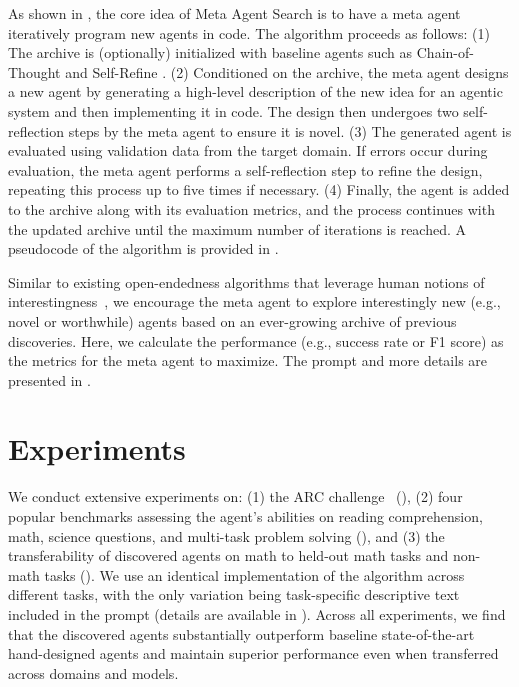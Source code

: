 \documentclass{article}
\newcommand{\ouralgo}{Meta Agent Search\xspace}
\begin{document}
As shown in , the core idea of \ouralgo is to have a meta agent iteratively program new agents in code. The algorithm proceeds as follows: (1) The archive is (optionally) initialized with baseline agents such as Chain-of-Thought \citep{wei2022chain} and Self-Refine \citep{madaan2024self,shinn2024reflexion}. (2) Conditioned on the archive, the meta agent designs a new agent by generating a high-level description of the new idea for an agentic system and then implementing it in code. The design then undergoes two self-reflection \citep{madaan2024self,shinn2024reflexion} steps by the meta agent to ensure it is novel. (3) The generated agent is evaluated using validation data from the target domain. If errors occur during evaluation, the meta agent performs a self-reflection step to refine the design, repeating this process up to five times if necessary. (4) Finally, the agent is added to the archive along with its evaluation metrics, and the process continues with the updated archive until the maximum number of iterations is reached. A pseudocode of the algorithm is provided in .

Similar to existing open-endedness algorithms that leverage human notions of interestingness~\citep{zhang2024omni,lu2024intelligent}, we encourage the meta agent to explore interestingly new (e.g., novel or worthwhile) agents based on an ever-growing archive of previous discoveries. Here, we calculate the performance (e.g., success rate or F1 score) as the metrics for the meta agent to maximize. The prompt and more details are presented in .

\section{Experiments}
\label{section:experiment}

We conduct extensive experiments on: (1) the ARC challenge~\citep{chollet2019measure} (), (2) four popular benchmarks assessing the agent's abilities on reading comprehension, math, science questions, and multi-task problem solving (), and (3) the transferability of discovered agents on math to held-out math tasks and non-math tasks (). We use an identical implementation of the algorithm across different tasks, with the only variation being task-specific descriptive text included in the prompt (details are available in ). 
Across all experiments, we find that the discovered agents substantially outperform baseline state-of-the-art hand-designed agents and maintain superior
performance even when transferred across domains and models.
\end{document}
